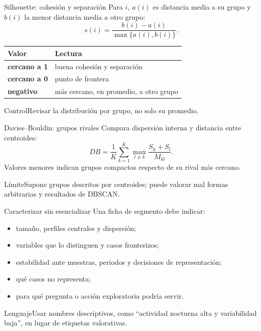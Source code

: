 \documentclass[aspectratio=169,10pt]{beamer}
\begin{document}
\begin{frame}{Silhouette: cohesión y separación}
  \small
  Para $i$, $a(i)$ es distancia media a su grupo y $b(i)$ la menor distancia media a otro grupo:
  \[s(i)=\frac{b(i)-a(i)}{\max\{a(i),b(i)\}}.\]
  \begin{tabularx}{\textwidth}{>{\bfseries}p{}X}\toprule
  Valor & Lectura\\\midrule
  cercano a 1 & buena cohesión y separación\\
  cercano a 0 & punto de frontera\\
  negativo & más cercano, en promedio, a otro grupo\\\bottomrule
  \end{tabularx}
  \begin{block}{Control}Revisar la distribución por grupo, no solo su promedio.\end{block}
\end{frame}

\begin{frame}{Davies--Bouldin: grupos rivales}
  \small
  Compara dispersión interna y distancia entre centroides:
  \[DB=\frac{1}{K}\sum_{k=1}^{K}\max_{l\neq k}\frac{S_k+S_l}{M_{kl}}.\]
  Valores menores indican grupos compactos respecto de su rival más cercano.
  \begin{alertblock}{Límite}Supone grupos descritos por centroides; puede valorar mal formas arbitrarias y resultados de DBSCAN.\end{alertblock}
\end{frame}

\begin{frame}{Caracterizar sin esencializar}
  \small
  Una ficha de segmento debe indicar:
  \begin{itemize}
    \item tamaño, perfiles centrales y dispersión;
    \item variables que lo distinguen y casos fronterizos;
    \item estabilidad ante muestras, periodos y decisiones de representación;
    \item qué casos no representa;
    \item para qué pregunta o acción exploratoria podría servir.
  \end{itemize}
  \begin{block}{Lenguaje}Usar nombres descriptivos, como ``actividad nocturna alta y variabilidad baja'', en lugar de etiquetas valorativas.\end{block}
\end{frame}
\end{document}
